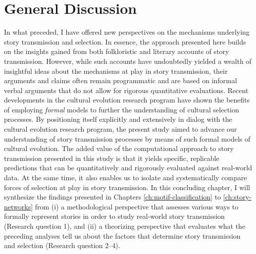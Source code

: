 
\chapter{General Discussion}\label{ch:conclusion}
 


\vspace{3.5ex plus 1ex minus .2ex}
\noindent In what preceded, I have offered new perspectives on the mechanisms underlying story transmission and selection. In essence, the approach presented here builds on the insights gained from both folkloristic and literary accounts of story transmission\autocite{stephens_mccallum,boyd:2009,boyd:2010,zipes:2006,zipes:2012,geerts:2014}. However, while such accounts have undoubtedly yielded a wealth of insightful ideas about the mechanisms at play in story transmission, their arguments and claims often remain programmatic and are based on informal verbal arguments that do not allow for rigorous quantitative evaluations. Recent developments in the cultural evolution research program have shown the benefits of employing \emph{formal} models to further the understanding of cultural selection processes. By positioning itself explicitly and extensively in dialog with the cultural evolution research program\autocite{sforzafeldman:1981,boyd_richerson:1985,mesoudi:2011,mesoudi:2015}, the present study aimed to advance our understanding of story transmission processes by means of such formal models of cultural evolution. The added value of the computational approach to story transmission presented in this study is that it yields specific, replicable predictions that can be quantitatively and rigorously evaluated against real-world data. At the same time, it also enables us to isolate and systematically compare forces of selection at play in story transmission. In this concluding chapter, I will synthesize the findings presented in Chapters \ref{ch:motif-classification} to \ref{ch:story-networks} from (i) a methodological perspective that assesses various ways to formally represent stories in order to study real-world story transmission (Research question 1), and (ii) a theorizing perspective that evaluates what the preceding analyses tell us about the factors that determine story transmission and selection (Research question 2--4).

